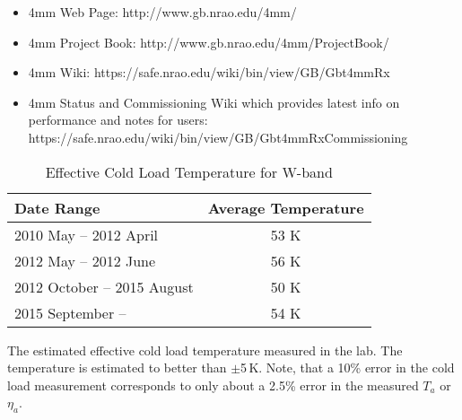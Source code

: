 \begin{itemize}

\item 4mm Web Page: http://www.gb.nrao.edu/4mm/

\item 4mm Project Book: http://www.gb.nrao.edu/4mm/ProjectBook/

\item 4mm Wiki: https://safe.nrao.edu/wiki/bin/view/GB/Gbt4mmRx

\item 4mm Status and Commissioning Wiki which provides latest info on
  performance and notes for users:
https://safe.nrao.edu/wiki/bin/view/GB/Gbt4mmRxCommissioning

\end{itemize}


\begin{table*}
\begin{center}
    \caption{Effective Cold Load Temperature for W-band}
    \begin{tabular}{lc}
      \hline 
      \hline 
      \multicolumn{1}{l}{Date Range} &
      \multicolumn{1}{c}{Average Temperature}\\
      \hline
2010 May -- 2012 April & 53 K\\
2012 May -- 2012 June  & 56 K\\
2012 October -- 2015 August  & 50 K\\
2015 September -- & 54 K\\
  \hline 
   \end{tabular}
\end{center}
   
 The estimated effective cold load
temperature measured in the lab.  The temperature is estimated to
better than $\pm$5\,K.  Note, that a 10\% error in the cold load
measurement corresponds to only about a 2.5\% error in the measured
$T_{a}$ or $\eta_{a}$.

\end{table*}
